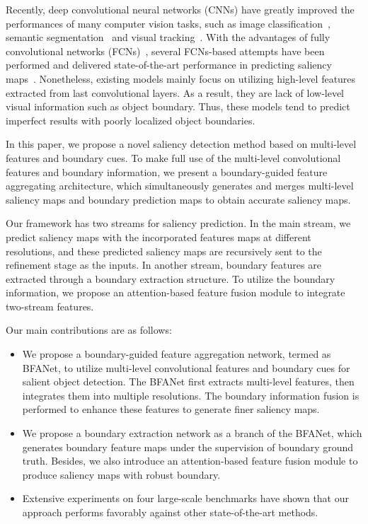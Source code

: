 \documentclass[journal]{IEEEtran}
\begin{document}
Recently, deep convolutional neural networks (CNNs) have greatly improved the performances of many computer vision tasks, such as image classification~\cite{Krizhevsky2012ImageNet}, semantic segmentation~\cite{FCN} and visual tracking~\cite{Wang2016STCT,zhang2018non}.
With the advantages of fully convolutional networks (FCNs)~\cite{FCN}, several FCNs-based attempts have been performed and delivered state-of-the-art performance in predicting saliency maps~\cite{Wang2016Saliency,Lee2016Deep,Liu2016DHSNet}.
Nonetheless, existing models mainly focus on utilizing high-level features extracted from last convolutional layers.
As a result, they are lack of low-level visual information such as object boundary.
Thus, these models tend to predict imperfect results with poorly localized object boundaries.

In this paper, we propose a novel saliency detection method based on multi-level features and boundary cues.
To make full use of the multi-level convolutional features and boundary information, we present a boundary-guided feature aggregating architecture, which simultaneously generates and merges multi-level saliency maps and boundary prediction maps to obtain accurate saliency maps.

Our framework has two streams for saliency prediction.
In the main stream, we predict saliency maps with the incorporated features maps at different resolutions, and these predicted saliency maps are recursively sent to the refinement stage as the inputs.
In another stream, boundary features are extracted through a boundary extraction structure.
To utilize the boundary information, we propose an attention-based feature fusion module to integrate two-stream features.

Our main contributions are as follows:
\begin{itemize}
\item 
We propose a boundary-guided feature aggregation network, termed as BFANet, to utilize multi-level convolutional features and boundary cues for salient object detection.
The BFANet first extracts multi-level features, then integrates them into multiple resolutions.
The boundary information fusion is performed to enhance these features to generate finer saliency maps.
\item 
We propose a boundary extraction network as a branch of the BFANet, which generates boundary feature maps under the supervision of boundary ground truth.
Besides, we also introduce an attention-based feature fusion module to produce saliency maps with robust boundary.
\item 
Extensive experiments on four large-scale benchmarks have shown that our approach performs favorably against other state-of-the-art methods.
\end{itemize}
\end{document}
